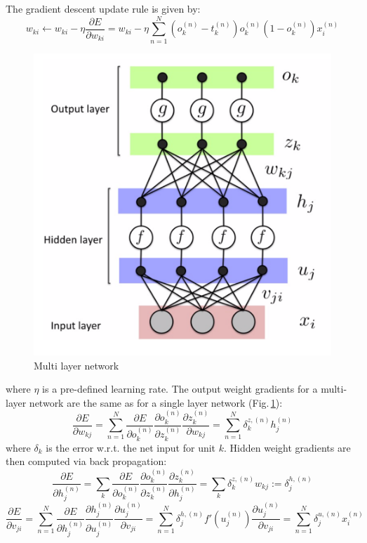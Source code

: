 The gradient descent update rule is given by:
$$w_{ki} \leftarrow w_{ki} - \eta \frac{\partial E}{\partial w_{ki}} = w_{ki} - \eta  \sum_{n=1}^N (o_k^{(n)} - t_k^{(n)})o_k^{(n)} (1-o_k^{(n)}) x_i^{(n)}$$
\begin{figure}[h]
	\centering
	\includegraphics[scale=0.5]{Figs/multilayerbackprop.png}
    \caption{Multi layer network}
    \label{multi}
\end{figure}
where $\eta$ is a pre-defined learning rate. The output weight gradients for a multi-layer network are the same as for a single layer network (Fig.\,\ref{multi}):
$$\frac{\partial E}{\partial w_{kj}} =  \sum_{n=1}^N \frac{\partial E}{\partial o_{k}^{(n)}}\frac{\partial o_{k}^{(n)}}{\partial z_{k}^{(n)}} \frac{\partial z_{k}^{(n)}}{\partial w_{kj}} = \sum_{n=1}^N \delta_k^{z,(n)} h_j^{(n)}$$
where $\delta_k$ is the error w.r.t. the net input for unit $k$. Hidden weight gradients are then computed via back propagation:
$$\frac{\partial E}{\partial h_{j}^{(n)}} =  \sum_{k} \frac{\partial E}{\partial o_{k}^{(n)}}\frac{\partial o_{k}^{(n)}}{\partial z_{k}^{(n)}} \frac{\partial z_{k}^{(n)}}{\partial h_{j}^{(n)}} = \sum_{k} \delta_k^{z,(n)} w_{kj} := \delta_j^{h,(n)}$$
$$ \frac{\partial E}{\partial v_{ji}} 
= \sum_{n=1}^N \frac{\partial E}{\partial h_{j}^{(n)}}\frac{\partial h_{j}^{(n)}}{\partial u_{j}^{(n)}} \frac{\partial u_j^{(n)}}{\partial v_{ji}}
= \sum_{n=1}^N \delta_j^{h,(n)} f'(u_j^{(n)})\frac{\partial u_j^{(n)}}{\partial v_{ji}} 
= \sum_{n=1}^N \delta_j^{u,(n)} x_i^{(n)} $$

